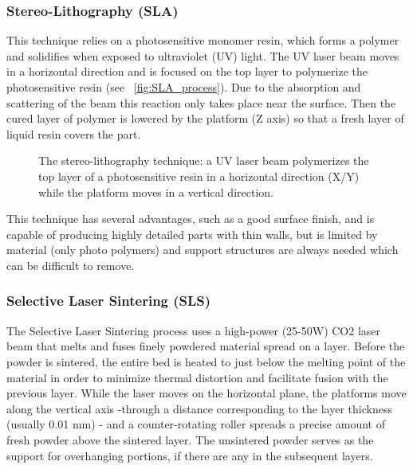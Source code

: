 \subsubsection{Stereo-Lithography (SLA)} %

This technique relies on a photosensitive monomer resin, which forms a polymer and solidifies when exposed to ultraviolet (UV) light. The UV laser beam moves in a horizontal direction and is focused on the top layer to polymerize the photosensitive resin (see \figurename~\ref{fig:SLA_process}). Due to the absorption and scattering of the beam this reaction only takes place near the surface. Then the cured layer of polymer is lowered by the platform (Z axis) so that a fresh layer of liquid resin covers the part.

\begin{figure}[h]
    \centering
        \hfil
        \hfil
    \caption{The stereo-lithography technique: a UV laser beam polymerizes the top layer of a photosensitive resin in a horizontal direction (X/Y) while the platform moves in a vertical direction.}
    \label{fig:SLA_technique}
\end{figure}

This technique has several advantages, such as a good surface finish, and is capable of producing highly detailed parts with thin walls, but is limited by material (only photo polymers) and support structures are always needed which can be difficult to remove.

\subsubsection{Selective Laser Sintering (SLS)} %
The Selective Laser Sintering process uses a high-power (25-50W) CO2 laser beam that melts and fuses finely powdered material spread on a layer. Before the powder is sintered, the entire bed is heated to just below the melting point of the material in order to minimize thermal distortion and facilitate fusion with the previous layer.
While the laser moves on the horizontal plane, the platforms move along the vertical axis -through a distance corresponding to the layer thickness (usually 0.01 mm) - and a counter-rotating roller spreads a precise amount of fresh powder above the sintered layer. The unsintered powder serves as the support for overhanging portions, if there are any in the subsequent layers.

